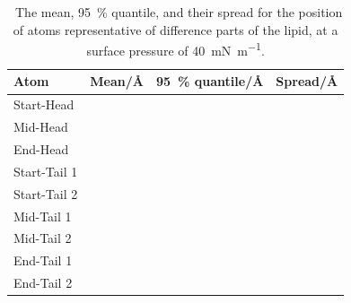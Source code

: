 \documentclass[amsmath,amssymb,superscriptaddress]{revtex4-1}
\begin{document}
%
%
\begin{table}[h]
\small
  \caption{\ The mean, \SI{95}{\percent} quantile, and their spread for the position of atoms representative of difference parts of the lipid, at a surface pressure of \SI{40}{\milli\newton\per\meter}.}
  \label{tab:spread2}
  \begin{tabular*}{0.48\textwidth}{@{\extracolsep{\fill}}llll}
    \hline
    Atom & Mean/\si{\angstrom} & \SI{95}{\percent} quantile/\si{\angstrom} & Spread/\si{\angstrom} \\
    \hline
    Start-Head &  &  &  \\
    Mid-Head &  &  &  \\
    End-Head &  &  &  \\
    \hline
    Start-Tail 1 &  &  &  \\
    Start-Tail 2 &  &  &  \\
    Mid-Tail 1 &  &  &  \\
    Mid-Tail 2 &  &  &  \\
    End-Tail 1 &  &  &  \\
    End-Tail 2 &  &  &  \\
    \hline
  \end{tabular*}
\end{table}
\end{document}
